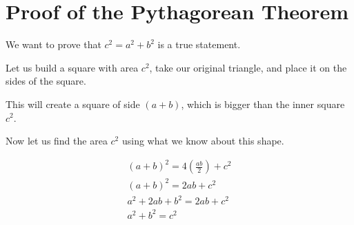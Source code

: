 \section{Proof of the Pythagorean Theorem}

We want to prove that \(c^2 = a^2 + b^2\) is a true statement.

Let us build a square with area \(c^2\), take our original triangle, and place it on the sides 
of the square.

This will create a square of side \((a+b)\), which is bigger than the inner square \(c^2\).

Now let us find the area \(c^2\) using what we know about this shape.

\begin{align*}
	{(a + b)}^2 = 4(\frac{ab}{2}) + c^2\\
	{(a + b)}^2 = 2ab + c^2\\
	a^2 + 2ab + b^2 = 2ab + c^2\\
	a^2 + b^2 = c^2
\end{align*}

\QED

